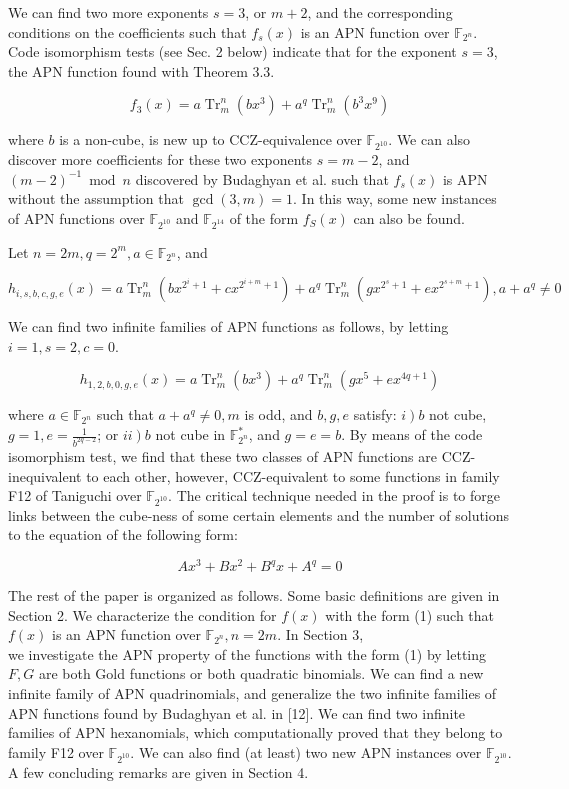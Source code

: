 \documentclass[10pt]{article}
\begin{document}
We can find two more exponents $s=3$, or $m+2$, and the corresponding conditions on the coefficients such that $f_{s}(x)$ is an APN function over $\mathbb{F}_{2^{n}}$. Code isomorphism tests (see Sec. 2 below) indicate that for the exponent $s=3$, the APN function found with Theorem 3.3.

$$
f_{3}(x)=a \operatorname{Tr}_{m}^{n}\left(b x^{3}\right)+a^{q} \operatorname{Tr}_{m}^{n}\left(b^{3} x^{9}\right)
$$

where $b$ is a non-cube, is new up to CCZ-equivalence over $\mathbb{F}_{2^{10}}$. We can also discover more coefficients for these two exponents $s=m-2$, and $(m-2)^{-1} \bmod n$ discovered by Budaghyan et al. such that $f_{s}(x)$ is APN without the assumption that $\operatorname{gcd}(3, m)=1$. In this way, some new instances of APN functions over $\mathbb{F}_{2^{10}}$ and $\mathbb{F}_{2^{14}}$ of the form $f_{S}(x)$ can also be found.

Let $n=2 m, q=2^{m}, a \in \mathbb{F}_{2^{n}}$, and

$$
h_{i, s, b, c, g, e}(x)=a \operatorname{Tr}_{m}^{n}\left(b x^{2^{i}+1}+c x^{2^{i+m}+1}\right)+a^{q} \operatorname{Tr}_{m}^{n}\left(g x^{2^{s}+1}+e x^{2^{s+m}+1}\right), a+a^{q} \neq 0
$$

We can find two infinite families of APN functions as follows, by letting $i=1, s=2, c=0$.

$$
h_{1,2, b, 0, g, e}(x)=a \operatorname{Tr}_{m}^{n}\left(b x^{3}\right)+a^{q} \operatorname{Tr}_{m}^{n}\left(g x^{5}+e x^{4 q+1}\right)
$$

where $a \in \mathbb{F}_{2^{n}}$ such that $a+a^{q} \neq 0, m$ is odd, and $b, g, e$ satisfy: $\left.i\right) b$ not cube, $g=1, e=\frac{1}{b^{2 q-2}}$; or $\left.i i\right) b$ not cube in $\mathbb{F}_{2^{n}}^{*}$, and $g=e=b$. By means of the code isomorphism test, we find that these two classes of APN functions are CCZ-inequivalent to each other, however, CCZ-equivalent to some functions in family F12 of Taniguchi over $\mathbb{F}_{2^{10}}$. The critical technique needed in the proof is to forge links between the cube-ness of some certain elements and the number of solutions to the equation of the following form:

$$
A x^{3}+B x^{2}+B^{q} x+A^{q}=0
$$

The rest of the paper is organized as follows. Some basic definitions are given in Section 2. We characterize the condition for $f(x)$ with the form (1) such that $f(x)$ is an APN function over $\mathbb{F}_{2^{n}}, n=2 m$. In Section 3,\\
we investigate the APN property of the functions with the form (1) by letting $F, G$ are both Gold functions or both quadratic binomials. We can find a new infinite family of APN quadrinomials, and generalize the two infinite families of APN functions found by Budaghyan et al. in [12]. We can find two infinite families of APN hexanomials, which computationally proved that they belong to family F12 over $\mathbb{F}_{2^{10}}$. We can also find (at least) two new APN instances over $\mathbb{F}_{2^{10}}$. A few concluding remarks are given in Section 4.
\end{document}
